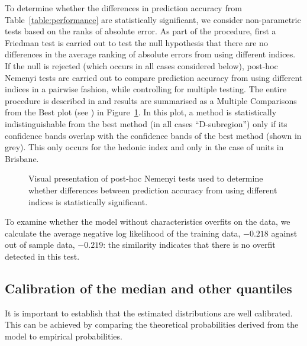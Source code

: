  
To determine whether the differences in prediction accuracy from Table~\ref{table:performance} are statistically significant, we consider non-parametric tests based on the ranks of absolute error. As part of the procedure, first a Friedman test is carried out to test the null hypothesis that there are no differences in the average ranking of absolute errors from using different indices. If the null is rejected (which occurs in all cases considered below), post-hoc Nemenyi tests are carried out to compare prediction accuracy from using different indices in a pairwise fashion, while controlling for multiple testing. The entire procedure is described in \cite{hollander:2013} and results are summarised as a Multiple Comparisons from the Best plot (see \cite{koning:2005}) in Figure~\ref{nemenyi_test}. In this plot, a method is statistically indistinguishable from the best method (in all cases ``D-subregion'') only if its confidence bands overlap with the confidence bands of the best method (shown in grey). This only occurs for the hedonic index and only in the case of units in Brisbane.

\begin{figure}[H]
	\begin{center}
	\end{center}
	\caption{Visual presentation of post-hoc Nemenyi tests used to determine whether differences between prediction accuracy from using different indices is statistically significant.}
	\label{nemenyi_test}
\end{figure}

To examine whether the model without characteristics overfits on the data, we calculate the average negative log likelihood of the training data, $-0.218$ against out of sample data, $-0.219$: the similarity indicates that there is no overfit detected in this test. 


\subsection{Calibration of the median and other quantiles}
\label{sec:median}


It is important to establish that the estimated distributions are well calibrated. This can be achieved by comparing the theoretical probabilities derived from the model to empirical probabilities. 

